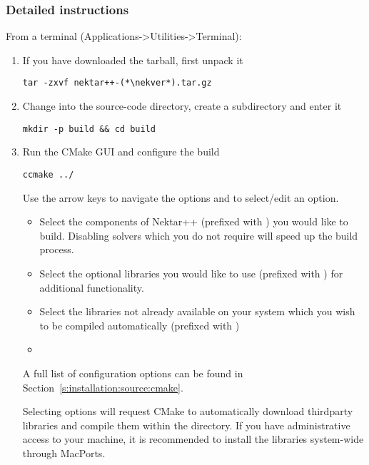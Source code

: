 \subsubsection{Detailed instructions}
From a terminal (Applications->Utilities->Terminal):
\begin{enumerate}
    \item If you have downloaded the tarball, first unpack it
    \begin{lstlisting}[style=BashInputStyle]
tar -zxvf nektar++-(*\nekver*).tar.gz
    \end{lstlisting}

    \item Change into the source-code directory, create a 
    subdirectory and enter it 
    \begin{lstlisting}[style=BashInputStyle]
    mkdir -p build && cd build
    \end{lstlisting}
    
    \item Run the CMake GUI and configure the build
    \begin{lstlisting}[style=BashInputStyle]
    ccmake ../
    \end{lstlisting}
    Use the arrow keys to navigate the options and  to select/edit
    an option.
    \begin{itemize}
        \item Select the components of Nektar++ (prefixed with
        ) you would like to build. Disabling solvers
        which you do not require will speed up the build process.
        \item Select the optional libraries you would like to use (prefixed with
        ) for additional functionality.
        \item Select the libraries not already available on your system which
        you wish to be compiled automatically (prefixed with 
        )
        \item 
    \end{itemize}
    A full list of configuration options can be found in
    Section~\ref{s:installation:source:cmake}.

    \begin{notebox}
    Selecting  options will request CMake to
    automatically download thirdparty libraries and compile them within the
    \nekpp directory. If you have administrative access to your machine, it is
    recommended to install the libraries system-wide through MacPorts.
    \end{notebox}
    

\end{enumerate}

